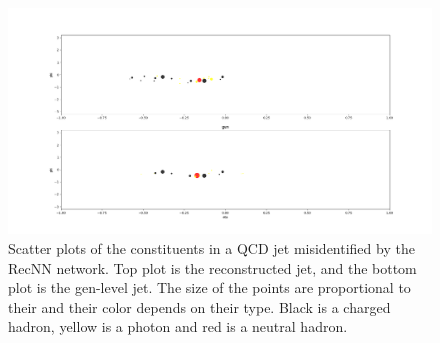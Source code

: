 \begin{figure}
    \centering
    \includegraphics[width=\textwidth]{Images/jet_display1.png}
    \caption{Scatter plots of the constituents in a QCD jet misidentified by the RecNN network. Top plot is the reconstructed jet, and the bottom plot is the gen-level jet. The size of the points are proportional to their \pt and their color depends on their type. Black is a charged hadron, yellow is a photon and red is a neutral hadron.}
    \label{fig:jet_display}
\end{figure}

